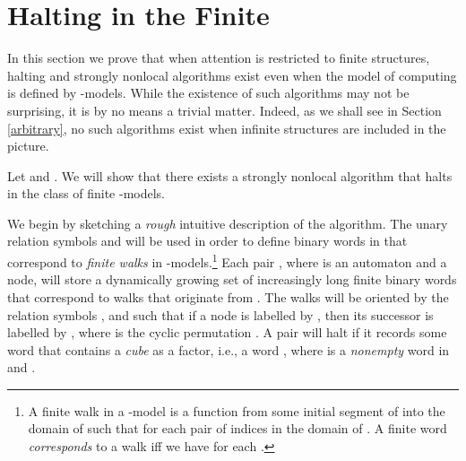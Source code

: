 \documentclass[copyright,creativecommons]{eptcs}
\begin{document}
\begin{comment}
Let  be a finite set of proposition symbols. Let  be a class
of Kripke frames of the vocabulary , and assume that there exists some message passing
automaton  of the vocabulary  that accepts a pointed -model  iff
. Then we say that  is -recognizable.
If  is -recognizable by a finite message passing automaton,
we say that  is -recognizable. The class of exactly all -recognizable
classes of pointed models is denoted by MPA-Regular. The class of exactly all -recognizable
classes of pointed models is denoted by FMPA-Regular. (Note that we do not limit attention to finite pointed models
here. The logical characterization results below hold with or without the restriction 
of attention to finite pointed models.)
\end{comment}








\section{Halting in the Finite}\label{finite}




In this section we prove that when 
attention is restricted to finite structures, halting
and strongly nonlocal algorithms exist
even when the model of computing is defined by -models.
While the existence of such algorithms may not be surprising,
it is by no means a trivial matter. Indeed, as we shall see in Section \ref{arbitrary}\hspace{0.4mm},
no such algorithms exist when infinite structures are included in the picture. 





Let  and .
We will show that there exists a
strongly nonlocal algorithm that halts in the class of finite -models.




We begin by sketching a \emph{rough} intuitive description of the algorithm.
The unary relation symbols  and  will be used in order to define binary words in 
that correspond to \emph{finite walks} in -models.\hspace{0.4mm}\footnote{
A finite walk in a -model  is a function from some initial segment of 
into the domain of  such that 
 for each pair  of indices in
the domain of . A finite word  \emph{corresponds} to a walk 
iff we have  for each .}
Each pair , where  is an automaton and  a node,
will store a dynamically growing set of increasingly long finite binary words that correspond to 
walks that originate from . The walks will be oriented by the relation symbols ,  and 
such that if a node  is labelled by , then its successor is labelled by ,
where  
is the cyclic permutation .
A pair  will halt if it records some word  that contains a
\emph{cube} as a factor, i.e.,  a word , where 
 is a \emph{nonempty} word in  and .
\end{document}
